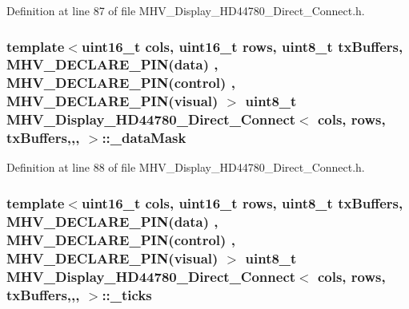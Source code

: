 Definition at line 87 of file M\-H\-V\-\_\-\-Display\-\_\-\-H\-D44780\-\_\-\-Direct\-\_\-\-Connect.\-h.

\hypertarget{class_m_h_v___display___h_d44780___direct___connect_ad095d81a074d347662bf5a2e571c626c}{
\subsubsection[{\-\_\-data\-Mask}]{\setlength{\rightskip}{0pt plus 5cm}template$<$uint16\-\_\-t cols, uint16\-\_\-t rows, uint8\-\_\-t tx\-Buffers, M\-H\-V\-\_\-\-D\-E\-C\-L\-A\-R\-E\-\_\-\-P\-I\-N(data) , M\-H\-V\-\_\-\-D\-E\-C\-L\-A\-R\-E\-\_\-\-P\-I\-N(control) , M\-H\-V\-\_\-\-D\-E\-C\-L\-A\-R\-E\-\_\-\-P\-I\-N(visual) $>$ uint8\-\_\-t {\bf M\-H\-V\-\_\-\-Display\-\_\-\-H\-D44780\-\_\-\-Direct\-\_\-\-Connect}$<$ cols, rows, tx\-Buffers,,, $>$\-::\-\_\-data\-Mask\hspace{0.3cm}{\ttfamily [protected]}}}\label{class_m_h_v___display___h_d44780___direct___connect_ad095d81a074d347662bf5a2e571c626c}


Definition at line 88 of file M\-H\-V\-\_\-\-Display\-\_\-\-H\-D44780\-\_\-\-Direct\-\_\-\-Connect.\-h.

\hypertarget{class_m_h_v___display___h_d44780___direct___connect_a4e3dea8cf7b70750de11858d52044113}{
\subsubsection[{\-\_\-ticks}]{\setlength{\rightskip}{0pt plus 5cm}template$<$uint16\-\_\-t cols, uint16\-\_\-t rows, uint8\-\_\-t tx\-Buffers, M\-H\-V\-\_\-\-D\-E\-C\-L\-A\-R\-E\-\_\-\-P\-I\-N(data) , M\-H\-V\-\_\-\-D\-E\-C\-L\-A\-R\-E\-\_\-\-P\-I\-N(control) , M\-H\-V\-\_\-\-D\-E\-C\-L\-A\-R\-E\-\_\-\-P\-I\-N(visual) $>$ uint8\-\_\-t {\bf M\-H\-V\-\_\-\-Display\-\_\-\-H\-D44780\-\_\-\-Direct\-\_\-\-Connect}$<$ cols, rows, tx\-Buffers,,, $>$\-::\-\_\-ticks\hspace{0.3cm}{\ttfamily [protected]}}}\label{class_m_h_v___display___h_d44780___direct___connect_a4e3dea8cf7b70750de11858d52044113}



